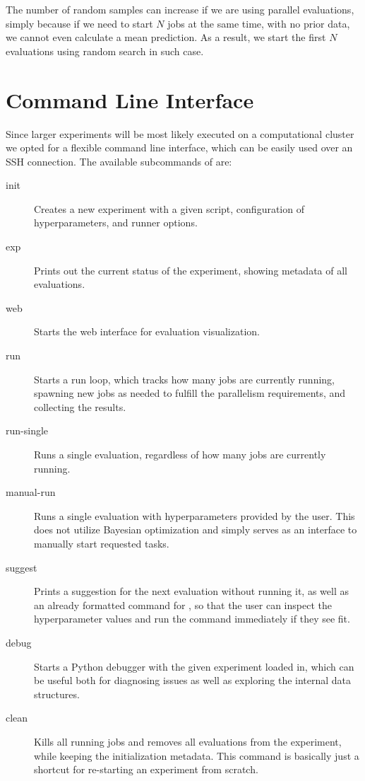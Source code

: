 The number of random samples can increase if we are using parallel evaluations, simply because if we need to start $N$ jobs at the same time, with no prior data, we cannot even calculate a mean prediction. As a result, we start the first $N$ evaluations using random search in such case.

\section{Command Line Interface}
\label{section:command-line-interface}

Since larger experiments will be most likely executed on a computational cluster we opted for a flexible command line interface, which can be easily used over an SSH connection. The available subcommands of \bopt are:

\begin{description}
    \item[init] Creates a new experiment with a given script, configuration of hyperparameters, and runner options.
    \item[exp] Prints out the current status of the experiment, showing metadata of all evaluations.
    \item[web] Starts the web interface for evaluation visualization.
    \item[run] Starts a run loop, which tracks how many jobs are currently running, spawning new jobs as needed to fulfill the parallelism requirements, and collecting the results.
    \item[run-single] Runs a single evaluation, regardless of how many jobs are currently running.
    \item[manual-run] Runs a single evaluation with hyperparameters provided by the user. This does not utilize Bayesian optimization and simply serves as an interface to manually start requested tasks.
    \item[suggest] Prints a suggestion for the next evaluation without running it, as well as an already formatted command for , so that the user can inspect the hyperparameter values and run the command immediately if they see fit.
    \item[debug] Starts a Python debugger with the given experiment loaded in, which can be useful both for diagnosing issues as well as exploring the internal data structures.
    \item[clean] Kills all running jobs and removes all evaluations from the experiment, while keeping the initialization metadata. This command is basically just a shortcut for re-starting an experiment from scratch.
\end{description}


